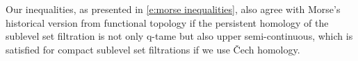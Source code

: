 Our inequalities, as presented in \eqref{e:morse inequalities}, also agree with Morse's historical version from functional topology if the persistent homology of the sublevel set filtration is not only q-tame but also upper semi-continuous, which is satisfied for compact sublevel set filtrations if we use \v{C}ech homology.




